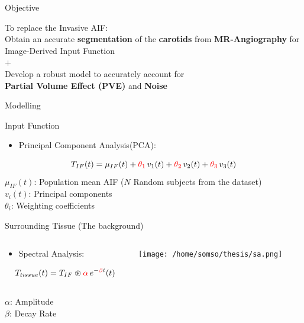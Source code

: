 \documentclass[aspectratio=169]{beamer}
\begin{document}
\begin{frame}{Objective}
	\centering\Large

	To replace the Invasive AIF:\\Obtain an accurate \textbf{segmentation} of the \textbf{carotids} from \textbf{MR-Angiography} for Image-Derived Input Function\\
	\bigskip
	+ \\
	\bigskip
	\Large{Develop a robust model to accurately account for \\
		\textbf{Partial Volume Effect (PVE)} and \textbf{Noise}}
\end{frame}

\begin{frame}{Modelling}
	\small
	\begin{block}{Input Function}
		\begin{itemize}
			\item Principal Component Analysis(PCA):
		\end{itemize}

		\[
			T_{IF}(t) = \mu_{IF}(t) +  \textcolor{red}{\theta_1}\,v_1(t) +  \textcolor{red}{\theta_2}\,v_2(t) +  \textcolor{red}{\theta_3}\,v_3(t)
		\]
		\(\mu_{IF}(t)\): Population mean AIF ($N$ Random subjects from the dataset)\\
		\(v_{i}(t)\): Principal components \\
		\(\theta_{i}\): Weighting coefficients
	\end{block}
	\pause
	\begin{block}{Surrounding Tissue (The background)}
		\vspace{4pt}
		\begin{columns}[T]
			\begin{column}[T]{0.6\textwidth}
				\begin{itemize}
					\item
					      Spectral Analysis:
				\end{itemize}
				\vspace{1ex}
				\[
					T_{tissue}(t) = T_{IF} \circledast \textcolor{red}{\alpha}\,e^{-\textcolor{red}{\beta}t} (t)
				\]
				\\
				$\alpha$: Amplitude\\
				$\beta$: Decay Rate
			\end{column}

			\begin{column}{0.25\textwidth}
				\texttt{[image: /home/somso/thesis/sa.png]}
			\end{column}
		\end{columns}
	\end{block}
\end{frame}
\end{document}
